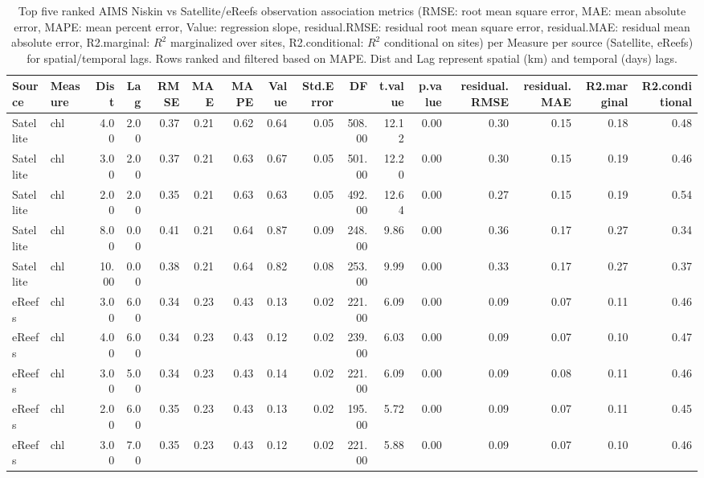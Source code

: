 \begin{table}[ht]
\centering
\caption[Top five ranked AIMS Niskin vs Satellite/eReefs observation association metrics (ordered by MPE)]{Top five ranked AIMS Niskin vs Satellite/eReefs observation association metrics (RMSE: root mean square error, MAE: mean absolute error, MAPE: mean percent error, Value: regression slope, residual.RMSE: residual root mean square error, residual.MAE: residual mean absolute error, R2.marginal: $R^2$ marginalized over sites, R2.conditional: $R^2$ conditional on sites) per Measure per source (Satellite, eReefs) for spatial/temporal lags.  Rows ranked and filtered based on MAPE. Dist and Lag represent spatial (km) and temporal (days) lags.} 
\label{tab:comp.all.mpe.sum.max}
\begingroup\scriptsize
\begin{tabular}{llrrrrrrrrrrrrrr}
  \toprule
Source & Measure & Dist & Lag & RMSE & MAE & MAPE & Value & Std.Error & DF & t.value & p.value & residual.RMSE & residual.MAE & R2.marginal & R2.conditional \\ 
  \midrule
Satellite & chl & 4.00 & 2.00 & 0.37 & 0.21 & 0.62 & 0.64 & 0.05 & 508.00 & 12.12 & 0.00 & 0.30 & 0.15 & 0.18 & 0.48 \\ 
  Satellite & chl & 3.00 & 2.00 & 0.37 & 0.21 & 0.63 & 0.67 & 0.05 & 501.00 & 12.20 & 0.00 & 0.30 & 0.15 & 0.19 & 0.46 \\ 
  Satellite & chl & 2.00 & 2.00 & 0.35 & 0.21 & 0.63 & 0.63 & 0.05 & 492.00 & 12.64 & 0.00 & 0.27 & 0.15 & 0.19 & 0.54 \\ 
  Satellite & chl & 8.00 & 0.00 & 0.41 & 0.21 & 0.64 & 0.87 & 0.09 & 248.00 & 9.86 & 0.00 & 0.36 & 0.17 & 0.27 & 0.34 \\ 
  Satellite & chl & 10.00 & 0.00 & 0.38 & 0.21 & 0.64 & 0.82 & 0.08 & 253.00 & 9.99 & 0.00 & 0.33 & 0.17 & 0.27 & 0.37 \\ 
  eReefs & chl & 3.00 & 6.00 & 0.34 & 0.23 & 0.43 & 0.13 & 0.02 & 221.00 & 6.09 & 0.00 & 0.09 & 0.07 & 0.11 & 0.46 \\ 
  eReefs & chl & 4.00 & 6.00 & 0.34 & 0.23 & 0.43 & 0.12 & 0.02 & 239.00 & 6.03 & 0.00 & 0.09 & 0.07 & 0.10 & 0.47 \\ 
  eReefs & chl & 3.00 & 5.00 & 0.34 & 0.23 & 0.43 & 0.14 & 0.02 & 221.00 & 6.09 & 0.00 & 0.09 & 0.08 & 0.11 & 0.46 \\ 
  eReefs & chl & 2.00 & 6.00 & 0.35 & 0.23 & 0.43 & 0.13 & 0.02 & 195.00 & 5.72 & 0.00 & 0.09 & 0.07 & 0.11 & 0.45 \\ 
  eReefs & chl & 3.00 & 7.00 & 0.35 & 0.23 & 0.43 & 0.12 & 0.02 & 221.00 & 5.88 & 0.00 & 0.09 & 0.07 & 0.10 & 0.46 \\ 

\end{tabular}
\end{table}
